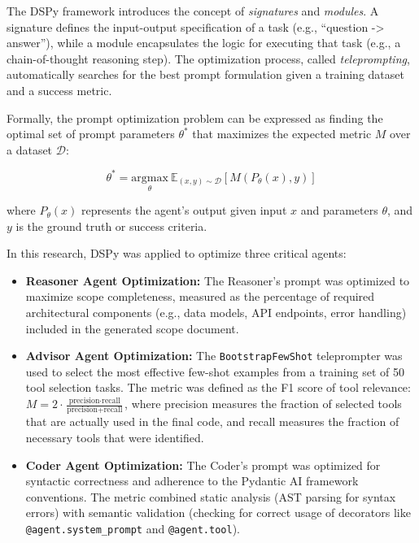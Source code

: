 \documentclass[lettersize,journal]{IEEEtran}
\begin{document}
The DSPy framework introduces the concept of \textit{signatures} and \textit{modules}. A signature defines the input-output specification of a task (e.g., ``question -> answer''), while a module encapsulates the logic for executing that task (e.g., a chain-of-thought reasoning step). The optimization process, called \textit{teleprompting}, automatically searches for the best prompt formulation given a training dataset and a success metric.


Formally, the prompt optimization problem can be expressed as finding the optimal set of prompt parameters $\theta^*$ that maximizes the expected metric $M$ over a dataset $\mathcal{D}$:

\begin{equation}
\label{eq:dspy_opt}
\theta^* = \underset{\theta}{\text{argmax}} \ \mathbb{E}_{(x, y) \sim \mathcal{D}} [M(P_{\theta}(x), y)]
\end{equation}

where $P_{\theta}(x)$ represents the agent's output given input $x$ and parameters $\theta$, and $y$ is the ground truth or success criteria.

In this research, DSPy was applied to optimize three critical agents:
\begin{itemize}
    \item \textbf{Reasoner Agent Optimization:} The Reasoner's prompt was optimized to maximize scope completeness, measured as the percentage of required architectural components (e.g., data models, API endpoints, error handling) included in the generated scope document.
    \item \textbf{Advisor Agent Optimization:} The \texttt{BootstrapFewShot} teleprompter was used to select the most effective few-shot examples from a training set of 50 tool selection tasks. The metric was defined as the F1 score of tool relevance: $M = 2 \cdot \frac{\text{precision} \cdot \text{recall}}{\text{precision} + \text{recall}}$, where precision measures the fraction of selected tools that are actually used in the final code, and recall measures the fraction of necessary tools that were identified.
    \item \textbf{Coder Agent Optimization:} The Coder's prompt was optimized for syntactic correctness and adherence to the Pydantic AI framework conventions. The metric combined static analysis (AST parsing for syntax errors) with semantic validation (checking for correct usage of decorators like \texttt{@agent.system\_prompt} and \texttt{@agent.tool}).
\end{itemize}
\end{document}
